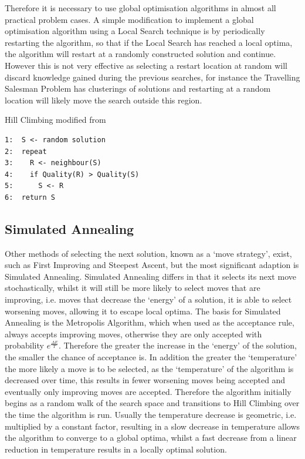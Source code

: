 \documentclass[]{final_report}
\begin{document}
Therefore it is necessary to use global optimisation algorithms in almost all practical problem cases. A simple modification to implement a global optimisation algorithm using a Local Search technique is by periodically restarting the algorithm, so that if the Local Search has reached a local optima, the algorithm will restart at a randomly constructed solution and continue. However this is not very effective as selecting a restart location at random will discard knowledge gained during the previous searches, for instance the Travelling Salesman Problem has clusterings of solutions and restarting at a random location will likely move the search outside this region.

Hill Climbing modified from \cite{luke:2013}

\begin{verbatim}
1:  S <- random solution
2:  repeat
3:    R <- neighbour(S)
4:    if Quality(R) > Quality(S)
5:      S <- R
6:  return S
\end{verbatim}

\subsection*{Simulated Annealing}

Other methods of selecting the next solution, known as a `move strategy', exist, such as First Improving and Steepest Ascent\cite{glover:2015}, but the most significant adaption is Simulated Annealing. Simulated Annealing differs in that it selects its next move stochastically, whilst it will still be more likely to select moves that are improving, i.e. moves that decrease the `energy' of a solution, it is able to select worsening moves, allowing it to escape local optima. The basis for Simulated Annealing is the Metropolis Algorithm, which when used as the acceptance rule, always accepts improving moves, otherwise they are only accepted with probability $e^{\frac{\Delta E}{T}}$. Therefore the greater the increase in the `energy' of the solution, the smaller the chance of acceptance is. In addition the greater the `temperature' the more likely a move is to be selected, as the `temperature' of the algorithm is decreased over time, this results in fewer worsening moves being accepted and eventually only improving moves are accepted\cite{siarry:2016}. Therefore the algorithm initially begins as a random walk of the search space and transitions to Hill Climbing over the time the algorithm is run\cite{luke:2013}. Usually the temperature decrease is geometric, i.e. multiplied by a constant factor, resulting in a slow decrease in temperature allows the algorithm to converge to a global optima, whilst a fast decrease from a linear reduction in temperature results in a locally optimal solution.
\end{document}
